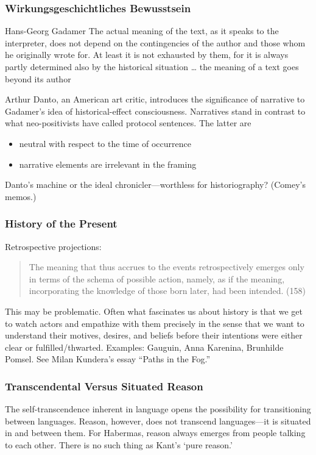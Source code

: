 \documentclass[xcolor=dvipsnames]{beamer}
\begin{document}
\begin{frame}
  \frametitle{Wirkungsgeschichtliches Bewusstsein}
  \begin{block}{Hans-Georg Gadamer}
    The actual meaning of the text, as it speaks to the interpreter,
    does not depend on the contingencies of the author and those whom
    he originally wrote for. At least it is not exhausted by them, for
    it is always partly determined also by the historical situation
    {\ldots} the meaning of a text goes beyond its author
  \end{block}
Arthur Danto, an American art critic, introduces the significance of
narrative to Gadamer's idea of historical-effect consciousness.
Narratives stand in contrast to what neo-positivists have called
protocol sentences. The latter are
\begin{itemize}
\item neutral with respect to the time of occurrence
\item narrative elements are irrelevant in the framing
\end{itemize}
Danto's machine or the ideal chronicler---worthless for
historiography? (Comey's memos.)
\end{frame}

\begin{frame}
  \frametitle{History of the Present}
  Retrospective projections:
  \begin{quote}
    The meaning that thus accrues to the events retrospectively
    emerges only in terms of the schema of possible action, namely, as
    if the meaning, incorporating the knowledge of those born later,
    had been intended. (158)
  \end{quote}
This may be problematic. Often what fascinates us about history is
that we get to watch actors and empathize with them precisely in the
sense that we want to understand their motives, desires, and beliefs
before their intentions were either clear or fulfilled/thwarted.
Examples: Gauguin, Anna Karenina, Brunhilde Pomsel. See Milan
Kundera's essay ``Paths in the Fog.''
\end{frame}

\begin{frame}
  \frametitle{Transcendental Versus Situated Reason}
The self-transcendence inherent in language opens the possibility for
transitioning between languages. Reason, however, does not transcend
languages---it is situated in and between them. For Habermas, reason
always emerges from people talking to each other. There is no such
thing as Kant's `pure reason.'   
\end{frame}
\end{document}
